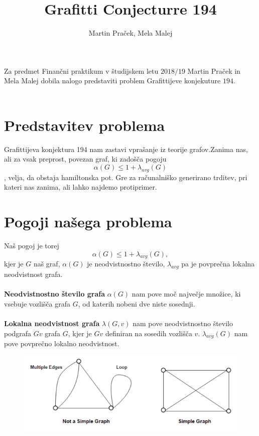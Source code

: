 \documentclass[12pt,a4paper]{amsart}
\begin{document}
\title{Grafitti Conjecturre 194}
\author{Martin Praček, Mela Malej}
\maketitle
Za predmet Finančni praktikum v študijskem letu $2018/19$ Martin Praček in Mela Malej dobila nalogo predstaviti problem Grafittijeve konjekuture $194$. \\\\
\section{Predstavitev problema}
Grafittijeva konjektura 194 nam zastavi vprašanje iz teorije grafov.Zanima nas, ali za vsak preprost, povezan graf, ki zadošča pogoju $$ \alpha(G) \leq 1 + \lambda_{avg}(G)$$, velja, da obstaja hamiltonska pot. Gre za računalniško generirano trditev, pri kateri nas zanima, ali lahko najdemo protiprimer.\\
\section{Pogoji našega problema}
Naš pogoj je torej $$ \alpha(G) \leq 1 + \lambda_{avg}(G),$$
kjer je $G$ naš graf, $\alpha(G)$ je neodvistnostno število, $\lambda_{avg}$ pa je povprečna lokalna neodvistnost grafa.\\
\ \\
\textbf{Neodvistnostno število grafa} $\alpha(G)$ nam pove moč največje množice, ki vsebuje  vozlišča grafa $G$, od katerih nobeni dve niste sosednji.\\
\ \\
\textbf{Lokalna neodvistnost grafa} $\lambda(G, v)$ nam pove neodvistnostno število podgrafa $Gv$ grafa $G$, kjer je $Gv$ definiran na sosedih vozlišča $v$. $\lambda_{avg}(G)$ nam pove povprečno lokalno neodvistnost.\\
\begin{figure}[h]
	\centering
	\includegraphics[scale=1]{slike/graf1}
\end{figure}
\end{document}
